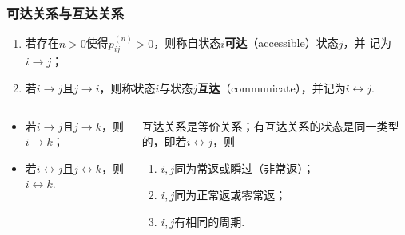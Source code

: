 \begin{frame}
    \frametitle{可达关系与互达关系}

    \begin{mydefinition}[可达关系与互达关系]
        \begin{enumerate}
            \item 若存在$n>0$使得$p_{ij}^{(n)}>0$，则称自状态$i$\textbf{可达}（accessible）状态$j$，并
            记为$i\to j$；
            \item 若$i\to j$且$j\to i$，则称状态$i$与状态$j$\textbf{互达}（communicate），并记为$i\leftrightarrow j$. 
        \end{enumerate}
    \end{mydefinition}

    \begin{columns}
        \begin{column}{.45\linewidth}
            \begin{mytheorem}[可达关系与互达关系的传递性]
                \begin{itemize}
                    \item 若$i\to j$且$j\to k$，则$i\to k$；
                    \item 若$i\leftrightarrow j$且$j\leftrightarrow k$，则$i\leftrightarrow k$.
                \end{itemize}
            \end{mytheorem}            
        \end{column}
        \begin{column}{.45\linewidth}
            \begin{mytheorem}[互达状态的等价性]
                互达关系是等价关系；有互达关系的状态是同一类型的，即若$i\leftrightarrow j$，则
                \begin{enumerate}
                    \item $i,j$同为常返或瞬过（非常返）；
                    \item $i,j$同为正常返或零常返；
                    \item $i,j$有相同的周期. 
                \end{enumerate}
            \end{mytheorem}            
        \end{column}
    \end{columns}
\end{frame}


